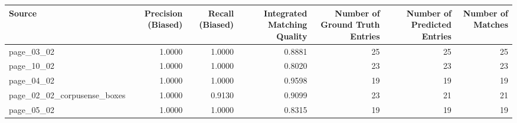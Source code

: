 \begin{tabular}{lrrrrrr}
\toprule
Source & Precision (Biased) & Recall (Biased) & Integrated Matching Quality & Number of Ground Truth Entries & Number of Predicted Entries & Number of Matches \\
\midrule
page\_03\_02 & 1.0000 & 1.0000 & 0.8881 & 25 & 25 & 25 \\
page\_10\_02 & 1.0000 & 1.0000 & 0.8020 & 23 & 23 & 23 \\
page\_04\_02 & 1.0000 & 1.0000 & 0.9598 & 19 & 19 & 19 \\
page\_02\_02\_corpusense\_boxes & 1.0000 & 0.9130 & 0.9099 & 23 & 21 & 21 \\
page\_05\_02 & 1.0000 & 1.0000 & 0.8315 & 19 & 19 & 19 \\
\bottomrule
\end{tabular}
